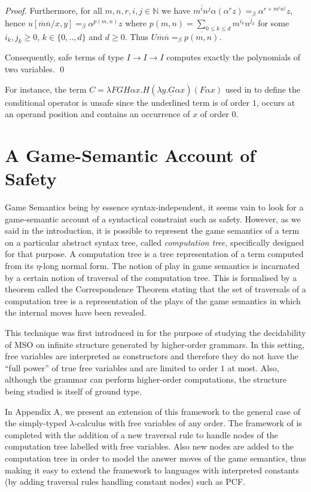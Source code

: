 \documentclass{llncs}
\newcommand{\encode}[1]{\overline{#1}}
\newcommand\nat{\mathbb{N}}
\newcommand\pcf{\textsf{PCF}}
\begin{document}
\begin{proof}
Furthermore, for all $m,n,r,i,j\in \nat$ 
we have $\encode{m^i n^j} \alpha (\alpha^r z) =_\beta
\alpha^{r + m^i n^j} z$,
hence $u[\encode{m} \encode{n}/x,y] =_\beta \alpha^{p(m,n)} z$ where $p(m,n) = \sum_{0\leq k \leq d} m^{i_k} n^{j_k}$ for some $i_k,j_k \geq 0$, $k \in\{ 0,..,d \}$ and $d\geq 0$.
Thus $U \encode{m} \encode{n} =_\beta \encode{p(m,n)}$. 

Consequently, safe terms of type $I \rightarrow I \rightarrow I$ computes
exactly the polynomials of two variables. \qed
\end{proof}

For instance, the term $ C = \lambda F G H \alpha x . H ( \underline{\lambda y . G \alpha x} ) (F \alpha x)$ used in \cite{citeulike:622637} to define the conditional operator is
unsafe since the underlined term is of order $1$, occurs at an operand position and contains an occurrence of $x$ of order $0$.


\section{A Game-Semantic Account of Safety}
\label{sec:gamesemaccount}
Game Semantics being by essence syntax-independent, it seems vain to look for a game-semantic account of a syntactical constraint such as safety. However, as we said in the introduction, it is possible to represent the game semantics of a term on a particular  abstract syntax tree, called \emph{computation tree}, specifically designed for that purpose. A computation tree is a tree representation of a term  computed from its $\eta$-long normal form. The notion of play in game semantics is incarnated by a certain notion of traversal of the computation tree. This is formalised by a theorem called the Correspondence Theorem stating that the set of traversals of a computation tree is a representation of the plays of the game semantics in which  the internal moves have been revealed.

This technique was first introduced in \cite{OngLics2006} for the purpose of studying the decidability of MSO on infinite structure generated by higher-order grammars. In this setting, free variables are interpreted as constructors and therefore they do not have the ``full power'' of true free variables and are limited to order $1$ at most. Also, although the grammar can perform higher-order computations, the structure being studied is itself of ground type.

In Appendix A, we present an extension of this framework to the general case of the simply-typed $\lambda$-calculus with free variables of any order. The framework of  \cite{OngLics2006} is completed with the addition of a new traversal rule to handle nodes of the computation tree labelled with free variables. Also new nodes are added to the computation tree in order to model the answer moves of the game semantics, thus making it easy to extend  the framework to languages with interpreted constants (by adding traversal rules handling constant nodes) such as \pcf.
\end{document}
